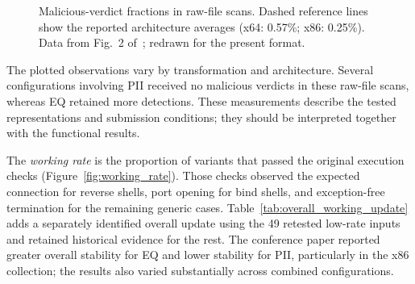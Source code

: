 \documentclass[runningheads]{llncs}
\providecommand{\Description}[1]{}
\begin{document}
\begin{figure}[tbp]
\Description{Malicious-verdict fractions in raw-file scans. Dashed reference lines show the reported architecture averages (x64: 0.57\%; x86: 0.25\%). Orange circles identify x64 and blue squares identify x86.}
\caption{Malicious-verdict fractions in raw-file scans. Dashed reference lines show the reported architecture averages (x64: 0.57\%; x86: 0.25\%). Data from Fig.~2 of~\cite{zone_secrypt_2026}; redrawn for the present format.}
\label{fig:all_payloads}
\end{figure}

The plotted observations vary by transformation and architecture. Several configurations involving PII received no malicious verdicts in these raw-file scans, whereas EQ retained more detections. These measurements describe the tested representations and submission conditions; they should be interpreted together with the functional results.

\label{par:working_rate}
The \emph{working rate} is the proportion of variants that passed the original execution checks (Figure~\ref{fig:working_rate}). Those checks observed the expected connection for reverse shells, port opening for bind shells, and exception-free termination for the remaining generic cases. Table~\ref{tab:overall_working_update} adds a separately identified overall update using the 49 retested low-rate inputs and retained historical evidence for the rest. The conference paper reported greater overall stability for EQ and lower stability for PII, particularly in the x86 collection; the results also varied substantially across combined configurations.
\end{document}
